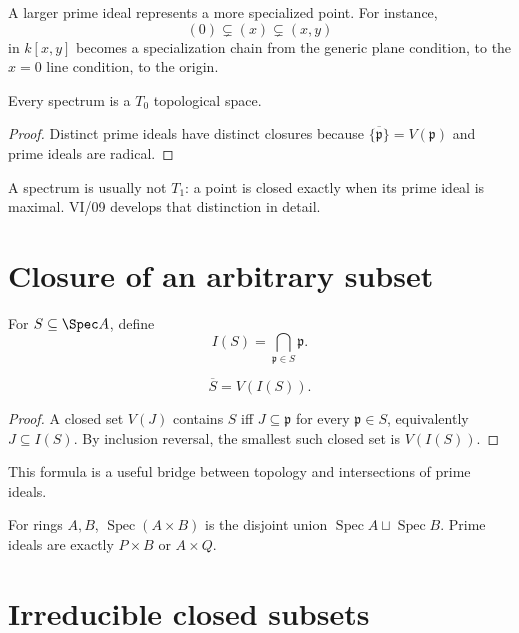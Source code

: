 

A larger prime ideal represents a more specialized point.  For instance,
\[
(0)\subsetneq(x)\subsetneq(x,y)
\]
in $k[x,y]$ becomes a specialization chain from the generic plane condition, to the
$x=0$ line condition, to the origin.

\begin{corollary}
Every spectrum is a $T_0$ topological space.
\end{corollary}

\begin{proof}
Distinct prime ideals have distinct closures because
$\overline{\{\mathfrak p\}}=V(\mathfrak p)$ and prime ideals are radical.
\end{proof}

A spectrum is usually not $T_1$: a point is closed exactly when its prime ideal is maximal.
VI/09 develops that distinction in detail.

\section{Closure of an arbitrary subset}

For $S\subseteq\Spec A$, define
\[
I(S)=\bigcap_{\mathfrak p\in S}\mathfrak p.
\]

\begin{theorem}
\[
\overline S=V(I(S)).
\]
\end{theorem}

\begin{proof}
A closed set $V(J)$ contains $S$ iff $J\subseteq\mathfrak p$ for every $\mathfrak p\in S$,
equivalently $J\subseteq I(S)$.  By inclusion reversal, the smallest such closed set is
$V(I(S))$.
\end{proof}

This formula is a useful bridge between topology and intersections of prime ideals.

\begin{example}\label{ex:vi07-expand-02}
For rings $A,B$, $\operatorname{Spec}(A\times B)$ is the disjoint union $\operatorname{Spec}A\sqcup\operatorname{Spec}B$.  Prime ideals are exactly $P\times B$ or $A\times Q$.
\end{example}
\section{Irreducible closed subsets}

